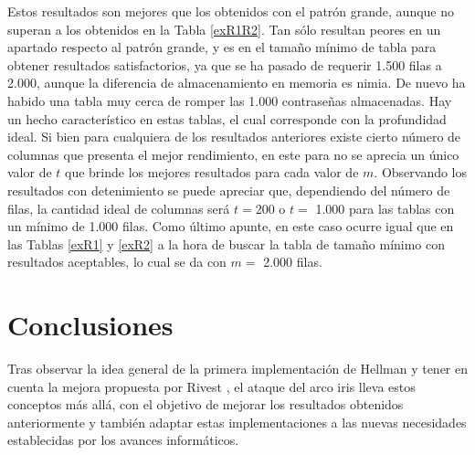 \documentclass[12pt,spanish,listoffigures,listoftables]{tfgetsinf}
\begin{document}
Estos resultados son mejores que los obtenidos con el patrón grande, aunque no superan a los obtenidos en la Tabla \ref{exR1R2}. Tan sólo resultan peores en un apartado respecto al patrón grande, y es en el tamaño mínimo de tabla para obtener resultados satisfactorios, ya que se ha pasado de requerir 1.500 filas a 2.000, aunque la diferencia de almacenamiento en memoria es nimia. De nuevo ha habido una tabla muy cerca de romper las 1.000 contraseñas almacenadas. Hay un hecho característico en estas tablas, el cual corresponde con la profundidad ideal. Si bien para cualquiera de los resultados anteriores existe cierto número de columnas que presenta el mejor rendimiento, en este para no se aprecia un único valor de $t$ que brinde los mejores resultados para cada valor de $m$. Observando los resultados con detenimiento se puede apreciar que, dependiendo del número de filas, la cantidad ideal de columnas será $t = $200 o $t =$ 1.000 para las tablas con un mínimo de 1.000 filas. Como último apunte, en este caso ocurre igual que en las Tablas \ref{exR1} y \ref{exR2} a la hora de buscar la tabla de tamaño mínimo con resultados aceptables, lo cual se da con $m =$ 2.000 filas.


\chapter{Conclusiones}

Tras observar la idea general de la primera implementación de Hellman \cite{hellman} y tener en cuenta la mejora propuesta por Rivest \cite{rivest}, el ataque del arco iris lleva estos conceptos más allá, con el objetivo de mejorar los resultados obtenidos anteriormente y también adaptar estas implementaciones a las nuevas necesidades establecidas por los avances informáticos.
\end{document}
